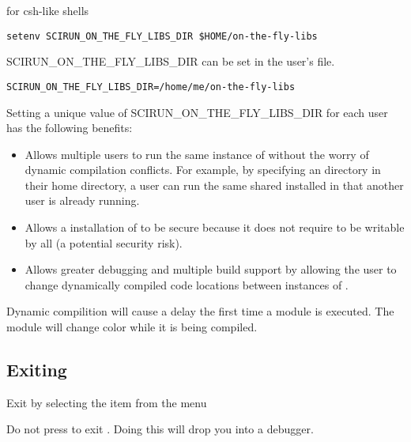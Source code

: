 for csh-like shells

\begin{verbatim}
setenv SCIRUN_ON_THE_FLY_LIBS_DIR $HOME/on-the-fly-libs
\end{verbatim}

SCIRUN\_ON\_THE\_FLY\_LIBS\_DIR can be set in the user's
 file.

\begin{verbatim}
SCIRUN_ON_THE_FLY_LIBS_DIR=/home/me/on-the-fly-libs
\end{verbatim}

Setting a unique value of SCIRUN\_ON\_THE\_FLY\_LIBS\_DIR for each
\sr{} user has the following benefits:

\begin{itemize}
\item Allows multiple users to run the same instance of \sr{} without the worry of  dynamic compilation conflicts.
  For example, by specifying an 
  directory in their home directory, a user can run the same shared
  \sr{} installed in  that another user
  is already running.

\item Allows a  installation of \sr{}
  to be secure because it does not require
   to be writable by
  all (a potential security risk).

\item Allows greater debugging and multiple build support by
  allowing the user to change dynamically compiled code locations
  between instances of \sr{}.

\end{itemize}

Dynamic compilition will cause a delay the first time a module is
executed.  The module will change color while it is being
compiled.

\subsection{Exiting \sr{}}
\label{sec:stopping}

Exit \sr{} by selecting the  item from the  menu

Do not press  to exit \sr{}.  Doing this will drop
you into a debugger.


